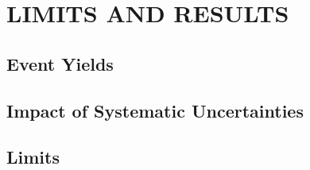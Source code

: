%
%
%


\chapter{\texorpdfstring{\uppercase {Limits and Results}}{Limits and Results}}
\label{ch:results}

\section{Event Yields}
\section{Impact of Systematic Uncertainties}
\section{Limits}

\begin{comment}
begin{figure}[!hbt]
	\centering
	\begin{subfigure}[t]{0.46\textwidth}
		\texttt{[image: \\figpath/Chapter4/2015\_08\_01\_combinedSM\_KinMEBDT\_StatsOnly.pdf]}
		\label{fig:limits_stats_only}
	\end{subfigure}
	\begin{subfigure}[t]{0.46\textwidth}
		\texttt{[image: \\figpath/Chapter4/2015\_08\_01\_combinedSM\_KinMEBDT.pdf]}
		\label{fig:limits_with_sys}
	\end{subfigure}
	\caption{Expected 95\% upper confidence level on the Higgs signal strength (left) without including systematic uncertainties and (right) with systematic uncertainties included. The median combined limit is found to be 2.01 without systematics and 3.48 with them.}
	\label{fig:limits}
\end{figure}
\end{comment}